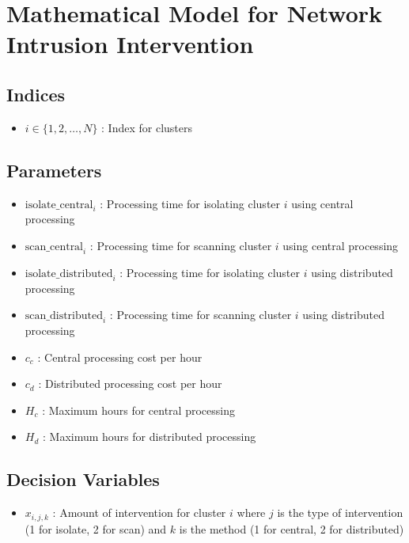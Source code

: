\documentclass{article}
\begin{document}
\section*{Mathematical Model for Network Intrusion Intervention}

\subsection*{Indices}
\begin{itemize}
    \item \( i \in \{1, 2, \ldots, N\} \) : Index for clusters
\end{itemize}

\subsection*{Parameters}
\begin{itemize}
    \item \( \text{isolate\_central}_i \) : Processing time for isolating cluster \( i \) using central processing
    \item \( \text{scan\_central}_i \) : Processing time for scanning cluster \( i \) using central processing
    \item \( \text{isolate\_distributed}_i \) : Processing time for isolating cluster \( i \) using distributed processing
    \item \( \text{scan\_distributed}_i \) : Processing time for scanning cluster \( i \) using distributed processing
    \item \( c_c \) : Central processing cost per hour
    \item \( c_d \) : Distributed processing cost per hour
    \item \( H_c \) : Maximum hours for central processing
    \item \( H_d \) : Maximum hours for distributed processing
\end{itemize}

\subsection*{Decision Variables}
\begin{itemize}
    \item \( x_{i,j,k} \) : Amount of intervention for cluster \( i \) where \( j \) is the type of intervention (1 for isolate, 2 for scan) and \( k \) is the method (1 for central, 2 for distributed)
\end{itemize}
\end{document}
